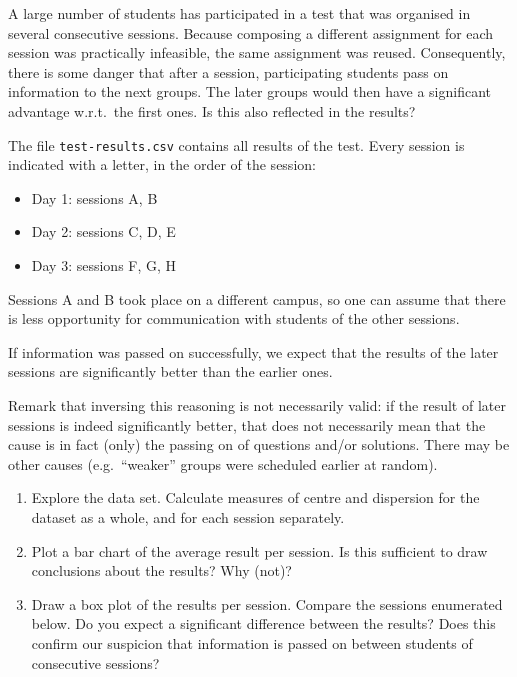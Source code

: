 \begin{exercise}
  A large number of students has participated in a test that was organised in several consecutive sessions. Because composing a different assignment for each session was practically infeasible, the same assignment was reused. Consequently, there is some danger that after a session, participating students pass on information to the next groups. The later groups would then have a significant advantage w.r.t.~the first ones. Is this also reflected in the results?
  
  The file \texttt{test-results.csv} contains all results of the test. Every session is indicated with a letter, in the order of the session:
  
  \begin{itemize}
    \item Day 1: sessions A, B
    \item Day 2: sessions C, D, E
    \item Day 3: sessions F, G, H
  \end{itemize}

  Sessions A and B took place on a different campus, so one can assume that there is less opportunity for communication with students of the other sessions.
  
  If information was passed on successfully, we expect that the results of the later sessions are significantly better than the earlier ones.
  
  Remark that inversing this reasoning is not necessarily valid: if the result of later sessions is indeed significantly better, that does not necessarily mean that the cause is in fact (only) the passing on of questions and/or solutions. There may be other causes (e.g.~``weaker'' groups were scheduled earlier at random).
  
  \begin{enumerate}
    \item Explore the data set. Calculate measures of centre and dispersion for the dataset as a whole, and for each session separately.
    
    \item Plot a bar chart of the average result per session. Is this sufficient to draw conclusions about the results? Why (not)?
    
    \item Draw a box plot of the results per session. Compare the sessions enumerated below. Do you expect a significant difference between the results? Does this confirm our suspicion that information is passed on between students of consecutive sessions?
    

\end{enumerate}
\end{exercise}
